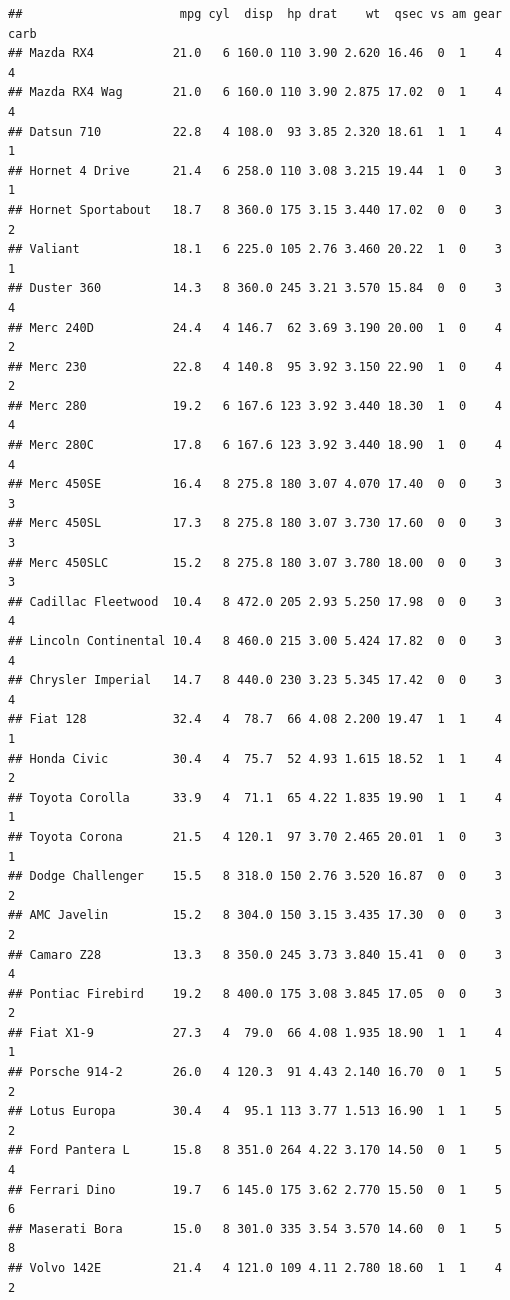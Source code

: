 \documentclass[
]{book}
\begin{document}
\begin{verbatim}
##                      mpg cyl  disp  hp drat    wt  qsec vs am gear carb
## Mazda RX4           21.0   6 160.0 110 3.90 2.620 16.46  0  1    4    4
## Mazda RX4 Wag       21.0   6 160.0 110 3.90 2.875 17.02  0  1    4    4
## Datsun 710          22.8   4 108.0  93 3.85 2.320 18.61  1  1    4    1
## Hornet 4 Drive      21.4   6 258.0 110 3.08 3.215 19.44  1  0    3    1
## Hornet Sportabout   18.7   8 360.0 175 3.15 3.440 17.02  0  0    3    2
## Valiant             18.1   6 225.0 105 2.76 3.460 20.22  1  0    3    1
## Duster 360          14.3   8 360.0 245 3.21 3.570 15.84  0  0    3    4
## Merc 240D           24.4   4 146.7  62 3.69 3.190 20.00  1  0    4    2
## Merc 230            22.8   4 140.8  95 3.92 3.150 22.90  1  0    4    2
## Merc 280            19.2   6 167.6 123 3.92 3.440 18.30  1  0    4    4
## Merc 280C           17.8   6 167.6 123 3.92 3.440 18.90  1  0    4    4
## Merc 450SE          16.4   8 275.8 180 3.07 4.070 17.40  0  0    3    3
## Merc 450SL          17.3   8 275.8 180 3.07 3.730 17.60  0  0    3    3
## Merc 450SLC         15.2   8 275.8 180 3.07 3.780 18.00  0  0    3    3
## Cadillac Fleetwood  10.4   8 472.0 205 2.93 5.250 17.98  0  0    3    4
## Lincoln Continental 10.4   8 460.0 215 3.00 5.424 17.82  0  0    3    4
## Chrysler Imperial   14.7   8 440.0 230 3.23 5.345 17.42  0  0    3    4
## Fiat 128            32.4   4  78.7  66 4.08 2.200 19.47  1  1    4    1
## Honda Civic         30.4   4  75.7  52 4.93 1.615 18.52  1  1    4    2
## Toyota Corolla      33.9   4  71.1  65 4.22 1.835 19.90  1  1    4    1
## Toyota Corona       21.5   4 120.1  97 3.70 2.465 20.01  1  0    3    1
## Dodge Challenger    15.5   8 318.0 150 2.76 3.520 16.87  0  0    3    2
## AMC Javelin         15.2   8 304.0 150 3.15 3.435 17.30  0  0    3    2
## Camaro Z28          13.3   8 350.0 245 3.73 3.840 15.41  0  0    3    4
## Pontiac Firebird    19.2   8 400.0 175 3.08 3.845 17.05  0  0    3    2
## Fiat X1-9           27.3   4  79.0  66 4.08 1.935 18.90  1  1    4    1
## Porsche 914-2       26.0   4 120.3  91 4.43 2.140 16.70  0  1    5    2
## Lotus Europa        30.4   4  95.1 113 3.77 1.513 16.90  1  1    5    2
## Ford Pantera L      15.8   8 351.0 264 4.22 3.170 14.50  0  1    5    4
## Ferrari Dino        19.7   6 145.0 175 3.62 2.770 15.50  0  1    5    6
## Maserati Bora       15.0   8 301.0 335 3.54 3.570 14.60  0  1    5    8
## Volvo 142E          21.4   4 121.0 109 4.11 2.780 18.60  1  1    4    2
\end{verbatim}
\end{document}
